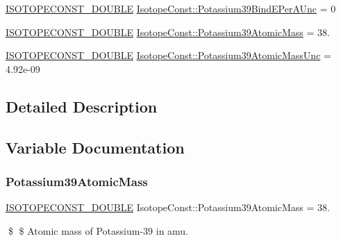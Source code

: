 \begin{DoxyCompactItemize}
\mbox{\hyperlink{group___isotope_const-_macros_ga8f45a7272ce02c0b4c65c44636ed719a}{I\+S\+O\+T\+O\+P\+E\+C\+O\+N\+S\+T\+\_\+\+D\+O\+U\+B\+LE}} \mbox{\hyperlink{group___isotope_const-_potassium-_k39_ga19e4172465c3b8125b0e0e6d66a6ebb9}{Isotope\+Const\+::\+Potassium39\+Bind\+E\+Per\+A\+Unc}} = 0
\item 
\mbox{\hyperlink{group___isotope_const-_macros_ga8f45a7272ce02c0b4c65c44636ed719a}{I\+S\+O\+T\+O\+P\+E\+C\+O\+N\+S\+T\+\_\+\+D\+O\+U\+B\+LE}} \mbox{\hyperlink{group___isotope_const-_potassium-_k39_ga165a81dda4c379ca1fc8f62a2581266e}{Isotope\+Const\+::\+Potassium39\+Atomic\+Mass}} = 38.
\item 
\mbox{\hyperlink{group___isotope_const-_macros_ga8f45a7272ce02c0b4c65c44636ed719a}{I\+S\+O\+T\+O\+P\+E\+C\+O\+N\+S\+T\+\_\+\+D\+O\+U\+B\+LE}} \mbox{\hyperlink{group___isotope_const-_potassium-_k39_ga5c1562464083347e12cddd2bf15ef9df}{Isotope\+Const\+::\+Potassium39\+Atomic\+Mass\+Unc}} = 4.\+92e-\/09
\end{DoxyCompactItemize}


\subsection{Detailed Description}


\subsection{Variable Documentation}
\mbox{\label{group___isotope_const-_potassium-_k39_ga165a81dda4c379ca1fc8f62a2581266e}} 
\subsubsection{\texorpdfstring{Potassium39\+Atomic\+Mass}{Potassium39AtomicMass}}
{\footnotesize\ttfamily \mbox{\hyperlink{group___isotope_const-_macros_ga8f45a7272ce02c0b4c65c44636ed719a}{I\+S\+O\+T\+O\+P\+E\+C\+O\+N\+S\+T\+\_\+\+D\+O\+U\+B\+LE}} Isotope\+Const\+::\+Potassium39\+Atomic\+Mass = 38.}

\$ \$ Atomic mass of Potassium-\/39 in amu. \mbox{\label{group___isotope_const-_potassium-_k39_ga5c1562464083347e12cddd2bf15ef9df}} 
